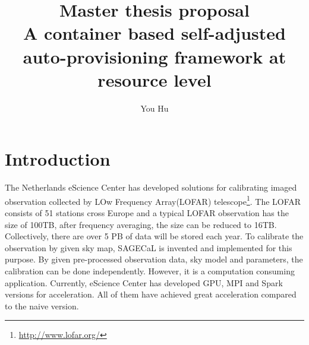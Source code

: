 \documentclass[sigchi]{acmart}
\begin{document}
\title{Master thesis proposal \\
       A container based self-adjusted auto-provisioning framework 
        at resource level}

\author{You Hu}



\renewcommand{\shortauthors}{You Hu}






\maketitle

\section{Introduction}
The Netherlands eScience Center has developed solutions for calibrating imaged observation collected by LOw Frequency Array(LOFAR) telescope\footnote{\url{http://www.lofar.org/}}.
The LOFAR consists of 51 stations cross Europe and a typical LOFAR observation has the size of 100TB, after frequency averaging, the size can be reduced to 16TB. \cite{Spreeuw2019}
Collectively, there are over 5 PB of data will be stored each year. \cite{Start2020} To calibrate the observation by given sky map, SAGECaL is invented and implemented for this purpose.\cite{Kazemi2011}
By given pre-processed observation data, sky model and parameters, the calibration can be done independently. However, it is a computation consuming application. Currently, eScience Center has developed GPU, MPI and Spark versions for acceleration.
All of them have achieved great acceleration compared to the naive version. 
\end{document}
